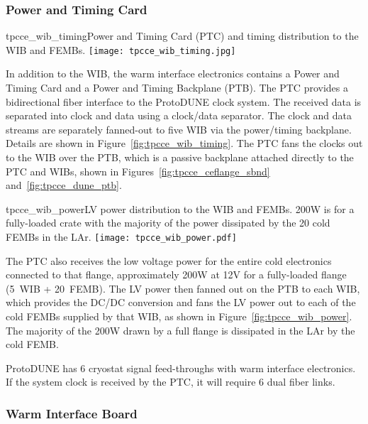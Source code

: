 \subsubsection{Power and Timing Card}
\label{subsubsec:power_timing_card}

\begin{cdrfigure}{tpcce_wib_timing}{Power and Timing Card (PTC) 
and timing distribution to the WIB and FEMBs.}
\texttt{[image: tpcce\_wib\_timing.jpg]}
\end{cdrfigure}

In addition to the WIB, the warm interface electronics contains a
Power and Timing Card and a Power and Timing Backplane
(PTB). The PTC provides a bidirectional fiber interface to the
ProtoDUNE clock system.  The received data is separated into clock and
data using a clock/data separator.  The clock and data
streams are separately fanned-out to five WIB via the power/timing
backplane. Details are shown in
Figure~\ref{fig:tpcce_wib_timing}. The PTC fans the clocks out to the WIB over the
PTB, which is a passive backplane attached directly to the PTC and
WIBs, shown in Figures~\ref{fig:tpcce_ceflange_sbnd} and~\ref{fig:tpcce_dune_ptb}.

\begin{cdrfigure}{tpcce_wib_power}{LV power distribution 
to the WIB and FEMBs. 200W is for a fully-loaded crate 
with the majority of the power dissipated by the 20 cold FEMBs in the LAr.}
\texttt{[image: tpcce\_wib\_power.pdf]}
\end{cdrfigure}

The PTC also receives the low voltage power for the entire cold
electronics connected to that flange, approximately 200W at 12V for a
fully-loaded flange (5~WIB + 20~FEMB). The LV power then fanned out
on the PTB to each WIB, which provides the DC/DC conversion and fans
the LV power out to each of the cold FEMBs supplied by that WIB, 
as shown in Figure~\ref{fig:tpcce_wib_power}. The 
majority of the 200W drawn by a full flange is dissipated in the LAr
by the cold FEMB.

ProtoDUNE has 6 cryostat signal feed-throughs with warm interface electronics. 
If the system clock is received by the PTC, it will require 6 dual fiber links.

\subsubsection{Warm Interface Board}
\label{subsubsec:warm_interface_board}

